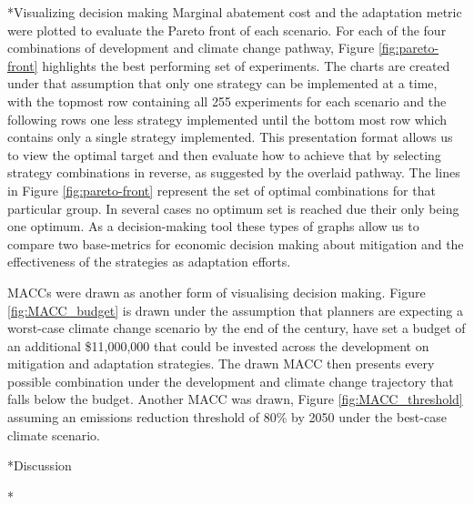 \documentclass[twocolumn, a4paper,10pt]{article}
\makeatletter
\renewcommand\section{\@startsection{section}{1}{\z@}{3pt}{3pt}{\normalfont\large\bfseries}}
\renewcommand\subsection{\@startsection{subsection}{1}{\z@}{\z@}{\z@}{\normalfont\normalsize\bfseries}}
\renewcommand\subsection{\@startsection{subsection}{1}{\z@}{\z@}{0.1pt}{\normalfont\normalsize\bfseries}}
\makeatother
\begin{document}
\subsection*{Visualizing decision making}
Marginal abatement cost and the adaptation metric were plotted to evaluate the Pareto front of each scenario. For each of the four combinations of development and climate change pathway, Figure \ref{fig:pareto-front} highlights the best performing set of experiments. The charts are created under that assumption that only one strategy can be implemented at a time, with the topmost row containing all 255 experiments for each scenario and the following rows one less strategy implemented until the bottom most row which contains only a single strategy implemented. This presentation format allows us to view the optimal target and then evaluate how to achieve that by selecting strategy combinations in reverse, as suggested by the overlaid pathway. The lines in Figure \ref{fig:pareto-front} represent the set of optimal combinations for that particular group. In several cases no optimum set is reached due their only being one optimum. As a decision-making tool these types of graphs allow us to compare two base-metrics for economic decision making about mitigation and the effectiveness of the strategies as adaptation efforts.

MACCs were drawn as another form of visualising decision making. Figure \ref{fig:MACC_budget} is drawn under the assumption that planners are expecting a worst-case climate change scenario by the end of the century, have set a budget of an additional \$11,000,000 that could be invested across the development on mitigation and adaptation strategies. The drawn MACC then presents every possible combination under the development and climate change trajectory that falls below the budget. Another MACC was drawn, Figure \ref{fig:MACC_threshold} assuming an emissions reduction threshold of 80\% by 2050 under the best-case climate scenario. 




\section*{Discussion}

\subsection*{}
\end{document}
